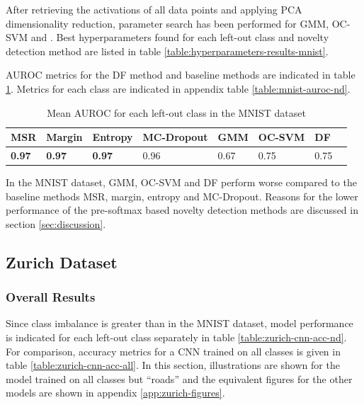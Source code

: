 \documentclass[10pt]{article}
\begin{document}
After retrieving the activations of all data points and applying \gls{PCA} dimensionality reduction, parameter search has been performed for \gls{GMM}, \gls{OC-SVM} and . Best hyperparameters found for each left-out class and novelty detection method are listed in table \ref{table:hyperparameters-results-mnist}.

\gls{AUROC} metrics for the \acrlong{DF} method and baseline methods are indicated in table \ref{table:mnist-auroc-nd-mean}. Metrics for each class are indicated in appendix table \ref{table:mnist-auroc-nd}.

\begin{table}[H]
    \centering
    \begin{tabular}{@{}llllllll@{}}
    \toprule
     \gls{MSR}  & Margin & Entropy & \gls{MC-Dropout} & \gls{GMM} & \gls{OC-SVM}  & \gls{DF} \\ \midrule
    \textbf{0.97} & \textbf{0.97} & \textbf{0.97} & 0.96 & 0.67 & 0.75 & 0.75 \\\bottomrule
    \end{tabular}
    \caption{Mean \gls{AUROC} for each left-out class in the \gls{MNIST} dataset}
    \label{table:mnist-auroc-nd-mean}
\end{table}

In the \gls{MNIST} dataset, \gls{GMM}, \gls{OC-SVM} and \gls{DF} perform worse compared to the baseline methods \gls{MSR}, margin, entropy and \gls{MC-Dropout}. Reasons for the lower performance of the pre-softmax based novelty detection methods are discussed in section \ref{sec:discussion}.


\subsection{Zurich Dataset}
\label{subsec:results-zurich}

\subsubsection{Overall Results}
Since class imbalance is greater than in the \gls{MNIST} dataset, model performance is indicated for each left-out class separately in table \ref{table:zurich-cnn-acc-nd}. For comparison, accuracy metrics for a \gls{CNN} trained on all classes is given in table \ref{table:zurich-cnn-acc-all}. In this section, illustrations are shown for the model trained on all classes but ``roads'' and the equivalent figures for the other models are shown in appendix \ref{app:zurich-figures}.
\end{document}
